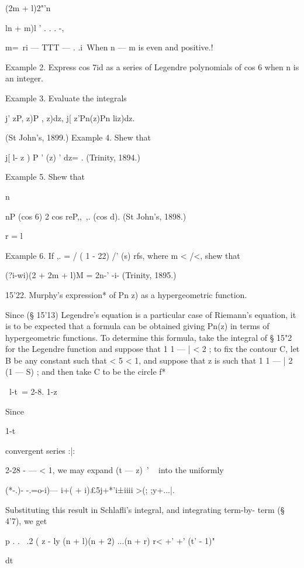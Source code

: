 {(2m + l)2"'n\ \ {ln +  m)l ' .   . . -, 

 m=~ri   — TTT — . .i\, When n — m is even and positive.! 

Example 2. Express cos 7id as a series of Legendre polynomials of cos 6 when n is an 
integer. 

Example 3. Evaluate the integrals 

j'  zP, z)P  , z)dz, j[ z'Pn(z)Pn liz)dz. 

(St John's, 1899.) 
Example 4. Shew that 

j[  l- z )  P ' (z) '  dz=   . (Trinity, 1894.) 

Example 5. Shew that 

n 

nP  (cos 6)  2 cos reP,,\ ,. (cos d). (St John's, 1898.) 

r = l 

Example 6. If  ,. = / ( 1 - 22)  /'  (s) rfs, where m < /<, shew that 

(?i-wi)(2  + 2m + l)M  = 2n-'  -i- (Trinity, 1895.) 

15'22. Murphy's expression* of Pn z) as a hypergeometric function. 

Since (§ 15'13) Legendre's equation is a particular case of Riemann's 
equation, it is to be expected that a formula can be obtained giving Pn(z) in 
terms of hypergeometric functions. To determine this formula, take the 
integral of § 15"2 for the Legendre function and suppose that 1 1 —   | < 2 ; to 
fix the contour C, let B be any constant such that < 5 < 1, and suppose that 
z is such that 1 1 —   |   2 (1 — S) ; and then take C to be the circle f* 

\ l-t\ = 2-8. 
1-z 



Since 



1-t 

convergent series :|: 



2-28 
  -  —  < 1, we may expand (t — z)~' ~  into the uniformly 



(*-.)- -.=o-i)—  i+(  + i)£5j+*'i±iiii >(; ;y+...|. 

Substituting this result in Schlafli's integral, and integrating term-by- 
term (§ 4'7), we get 

p . . \  .2 ( z - ly (n + l)(n + 2) ...(n + r) r< +' +' (t' - 1)" 



dt 



}}

